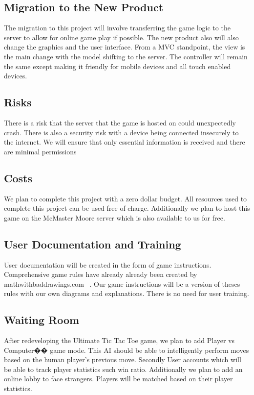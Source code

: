 \documentclass[12pt, titlepage]{article}
\begin{document}
\subsection{Migration to the New Product}
The migration to this project will involve transferring the game logic to the
server to allow for online game play if possible. The new product also will also
change the graphics and the user interface. From a MVC standpoint, the view is
the main change with the model shifting to the server. The controller will
remain the same except making it friendly for mobile devices and all touch
enabled devices.

\subsection{Risks}
There is a risk that the server that the game is hosted on could unexpectedly
crash. There is also a security risk with a device being connected insecurely to
the internet. We will ensure that only essential information is received and
there are minimal permissions

\subsection{Costs}
We plan to complete this project with a zero dollar budget. All resources used
to complete this project can be used free of charge. Additionally we plan to
host this game on the McMaster Moore server which is also available to us for
free.

\subsection{User Documentation and Training}
User documentation will be created in the form of game instructions.
Comprehensive game rules have already already been created by
mathwithbaddrawings.com~\citep{Rules} . Our game instructions will be a version
of theses rules with our own diagrams and explanations. There is no need for
user training.


\subsection{Waiting Room}
After redeveloping the Ultimate Tic Tac Toe game, we plan to add Player vs
Computer�� game mode. This AI should be able to intelligently perform moves based
on the human player's previous move. Secondly User accounts which will be able
to track player statistics such win ratio. Additionally we plan to add an online
lobby to face strangers. Players will be matched based on their player
statistics.
\end{document}
